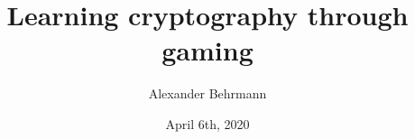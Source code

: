 \documentclass{l4proj}
\begin{document}
\title{Learning cryptography through gaming}
\author{Alexander Behrmann}
\date{April 6th, 2020}

\maketitle

\begin{abstract}
    
\end{abstract}


%
%
%
\educationalconsent
\def\consentname {Alexander Behrmann} %
\def\consentdate {20 March 2020} %

\tableofcontents

%
%
%
%
%
%
%
%
\end{document}
